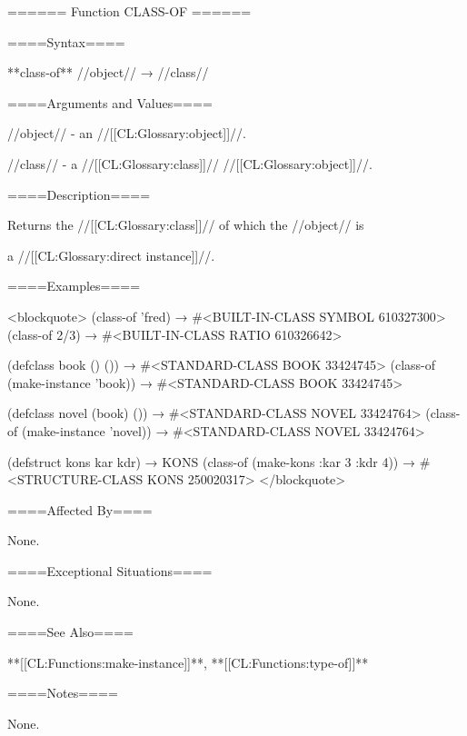 ====== Function CLASS-OF ======

====Syntax====

**class-of** //object// → //class//

====Arguments and Values====

//object// - an //[[CL:Glossary:object]]//.

//class// - a //[[CL:Glossary:class]]// //[[CL:Glossary:object]]//.

====Description====

Returns the //[[CL:Glossary:class]]// of which the //object// is

a //[[CL:Glossary:direct instance]]//.

====Examples====

<blockquote> (class-of 'fred) → #<BUILT-IN-CLASS SYMBOL 610327300> (class-of 2/3) → #<BUILT-IN-CLASS RATIO 610326642>

(defclass book () ()) → #<STANDARD-CLASS BOOK 33424745> (class-of (make-instance 'book)) → #<STANDARD-CLASS BOOK 33424745>

(defclass novel (book) ()) → #<STANDARD-CLASS NOVEL 33424764> (class-of (make-instance 'novel)) → #<STANDARD-CLASS NOVEL 33424764>

(defstruct kons kar kdr) → KONS (class-of (make-kons :kar 3 :kdr 4)) → #<STRUCTURE-CLASS KONS 250020317> </blockquote>

====Affected By====

None.

====Exceptional Situations====

None.

====See Also====

**[[CL:Functions:make-instance]]**, **[[CL:Functions:type-of]]**

====Notes====

None.


